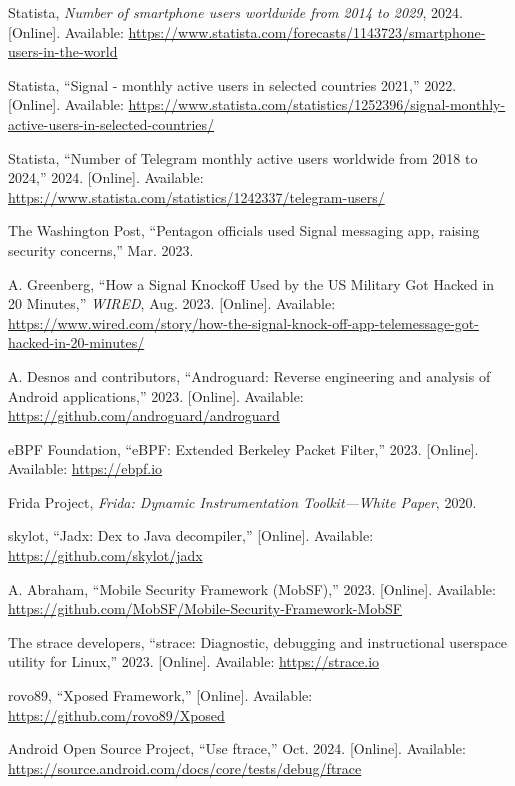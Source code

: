 \documentclass[a4paper,12pt]{report}
\begin{document}
\begin{thebibliography}{99}
Statista, \emph{Number of smartphone users worldwide from 2014 to 2029}, 2024. [Online]. Available: \url{https://www.statista.com/forecasts/1143723/smartphone-users-in-the-world}

Statista, “Signal - monthly active users in selected countries 2021,” 2022. [Online]. Available: \url{https://www.statista.com/statistics/1252396/signal-monthly-active-users-in-selected-countries/}

Statista, “Number of Telegram monthly active users worldwide from 2018 to 2024,” 2024. [Online]. Available: \url{https://www.statista.com/statistics/1242337/telegram-users/}

The Washington Post, “Pentagon officials used Signal messaging app, raising security concerns,” Mar. 2023.

A. Greenberg, “How a Signal Knockoff Used by the US Military Got Hacked in 20 Minutes,” \emph{WIRED}, Aug. 2023. [Online]. Available: \url{https://www.wired.com/story/how-the-signal-knock-off-app-telemessage-got-hacked-in-20-minutes/}

A. Desnos and contributors, “Androguard: Reverse engineering and analysis of Android applications,” 2023. [Online]. Available: \url{https://github.com/androguard/androguard}

eBPF Foundation, “eBPF: Extended Berkeley Packet Filter,” 2023. [Online]. Available: \url{https://ebpf.io}

Frida Project, \emph{Frida: Dynamic Instrumentation Toolkit—White Paper}, 2020.

skylot, “Jadx: Dex to Java decompiler,” [Online]. Available: \url{https://github.com/skylot/jadx}

A. Abraham, “Mobile Security Framework (MobSF),” 2023. [Online]. Available: \url{https://github.com/MobSF/Mobile-Security-Framework-MobSF}

The strace developers, “strace: Diagnostic, debugging and instructional userspace utility for Linux,” 2023. [Online]. Available: \url{https://strace.io}

rovo89, “Xposed Framework,” [Online]. Available: \url{https://github.com/rovo89/Xposed}

Android Open Source Project, “Use ftrace,” Oct. 2024. [Online]. Available: \url{https://source.android.com/docs/core/tests/debug/ftrace}


\end{thebibliography}
\end{document}
